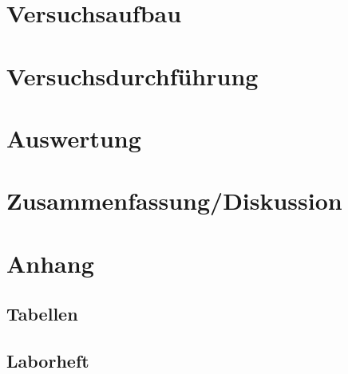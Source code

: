\documentclass[12pt]{article}
\begin{document}
\newpage
\section{Versuchsaufbau}


\newpage
\section{Versuchsdurchführung}



\newpage
\section{Auswertung}


\newpage
\section{Zusammenfassung/Diskussion}


\newpage
\section{Anhang}

\subsection{Tabellen}

%


%

\newpage
\subsection{Laborheft}

\newpage
\listoffigures


\newpage
\thispagestyle{empty}
\begin{thebibliography}{9}

  

  
  

\end{thebibliography}
\end{document}
